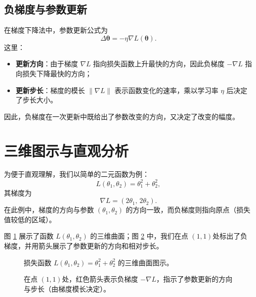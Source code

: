 \documentclass[11pt,twocolumn]{ctexart} %
\begin{document}
\subsection{负梯度与参数更新}
在梯度下降法中，参数更新公式为
\begin{equation}
    \Delta \boldsymbol{\theta} = -\eta \nabla L(\boldsymbol{\theta}).
\end{equation}
这里：
\begin{itemize}
    \item \textbf{更新方向}：由于梯度 \( \nabla L \) 指向损失函数上升最快的方向，因此负梯度 \( -\nabla L \) 指向损失下降最快的方向；
    \item \textbf{更新步长}：梯度的模长 \( \|\nabla L\| \) 表示函数变化的速率，乘以学习率 \( \eta \) 后决定了步长大小。
\end{itemize}
因此，负梯度在一次更新中既给出了参数改变的方向，又决定了改变的幅度。

\section{三维图示与直观分析}
为便于直观理解，我们以简单的二元函数为例：
\begin{equation}
    L(\theta_1, \theta_2) = \theta_1^2 + \theta_2^2,
\end{equation}
其梯度为
\begin{equation}
    \nabla L = (2\theta_1,\, 2\theta_2).
\end{equation}
在此例中，梯度的方向与参数 \((\theta_1,\theta_2)\) 的方向一致，而负梯度则指向原点（损失值较低的区域）。

图 \ref{fig:loss_surface} 展示了函数 \( L(\theta_1,\theta_2) \) 的三维曲面；图 \ref{fig:gradient_descent} 中，我们在点 \((1,1)\)处标出了负梯度，并用箭头展示了参数更新的方向和相对步长。

\begin{figure}[H]
    \centering
    \resizebox{0.8\columnwidth}{!}{
        
    }
    \caption{损失函数 \( L(\theta_1,\theta_2)=\theta_1^2+\theta_2^2 \) 的三维曲面图示。}
    \label{fig:loss_surface}
\end{figure}

\begin{figure}[H]
    \centering
    \resizebox{0.8\columnwidth}{!}{
        
    }
    \caption{在点 \((1,1)\)处，红色箭头表示负梯度 \( -\nabla L \)，指示了参数更新的方向与步长（由梯度模长决定）。}
    \label{fig:gradient_descent}
\end{figure}
\end{document}
